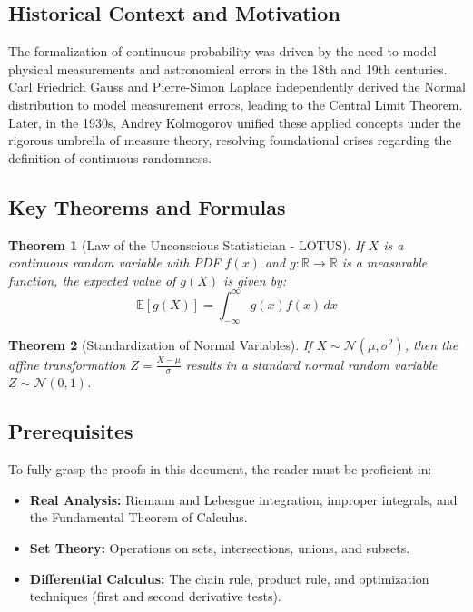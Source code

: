 \documentclass[11pt, a4paper]{article}
\newtheorem{theorem}{Theorem}[section]
\theoremstyle{definition}
\theoremstyle{remark}
\newcommand{\R}{\mathbb{R}}
\newcommand{\E}{\mathbb{E}}
\begin{document}
\subsection{Historical Context and Motivation}
The formalization of continuous probability was driven by the need to model physical measurements and astronomical errors in the 18th and 19th centuries. Carl Friedrich Gauss and Pierre-Simon Laplace independently derived the Normal distribution to model measurement errors, leading to the Central Limit Theorem. Later, in the 1930s, Andrey Kolmogorov unified these applied concepts under the rigorous umbrella of measure theory, resolving foundational crises regarding the definition of continuous randomness.

\subsection{Key Theorems and Formulas}
\begin{theorem}[Law of the Unconscious Statistician - LOTUS]
If $X$ is a continuous random variable with PDF $f(x)$ and $g: \R \to \R$ is a measurable function, the expected value of $g(X)$ is given by:
\[ \E[g(X)] = \int_{-\infty}^{\infty} g(x) f(x) \, dx \]
\end{theorem}

\begin{theorem}[Standardization of Normal Variables]
If $X \sim \mathcal{N}(\mu, \sigma^2)$, then the affine transformation $Z = \frac{X - \mu}{\sigma}$ results in a standard normal random variable $Z \sim \mathcal{N}(0, 1)$.
\end{theorem}

\subsection{Prerequisites}
To fully grasp the proofs in this document, the reader must be proficient in:
\begin{itemize}
    \item \textbf{Real Analysis:} Riemann and Lebesgue integration, improper integrals, and the Fundamental Theorem of Calculus.
    \item \textbf{Set Theory:} Operations on sets, intersections, unions, and subsets.
    \item \textbf{Differential Calculus:} The chain rule, product rule, and optimization techniques (first and second derivative tests).
\end{itemize}
\end{document}
